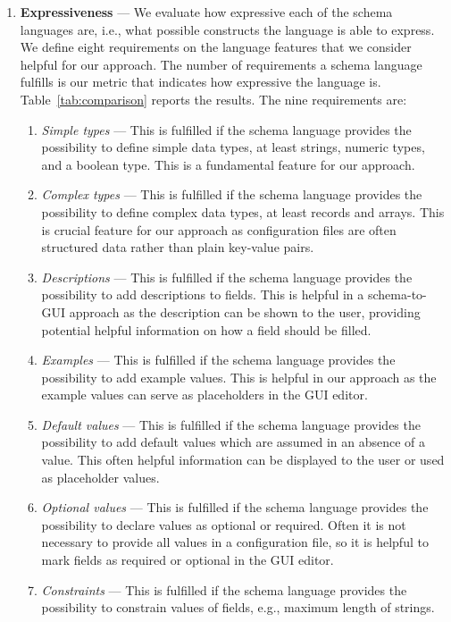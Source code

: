 \begin{enumerate}
    \item \textbf{Expressiveness} --- We evaluate how expressive each of the schema languages are, i.e., what possible constructs the language is able to express.
    We define eight requirements on the language features that we consider helpful for our approach.
    The number of requirements a schema language fulfills is our metric that indicates how expressive the language is.
    Table~\ref{tab:comparison} reports the results.
    The nine requirements are:
    \begin{enumerate}
        \item \textit{Simple types} --- This is fulfilled if the schema language provides the possibility to define simple data types, at least strings, numeric types, and a boolean type.
        This is a fundamental feature for our approach.
        \item \textit{Complex types} --- This is fulfilled if the schema language provides the possibility to define complex data types, at least records and arrays.
        This is crucial feature for our approach as configuration files are often structured data rather than plain key-value pairs.
        \item \textit{Descriptions} --- This is fulfilled if the schema language provides the possibility to add descriptions to fields.
        This is helpful in a schema-to-GUI approach as the description can be shown to the user, providing potential helpful information on how a field should be filled.
        \item \textit{Examples} --- This is fulfilled if the schema language provides the possibility to add example values.
        This is helpful in our approach as the example values can serve as placeholders in the GUI editor.
        \item \textit{Default values} --- This is fulfilled if the schema language provides the possibility to add default values which are assumed in an absence of a value.
        This often helpful information can be displayed to the user or used as placeholder values.
        \item \textit{Optional values} --- This is fulfilled if the schema language provides the possibility to declare values as optional or required.
        Often it is not necessary to provide all values in a configuration file, so it is helpful to mark fields as required or optional in the GUI editor.
        \item \textit{Constraints} --- This is fulfilled if the schema language provides the possibility to constrain values of fields, e.g., maximum length of strings.

\end{enumerate}
\end{enumerate}
